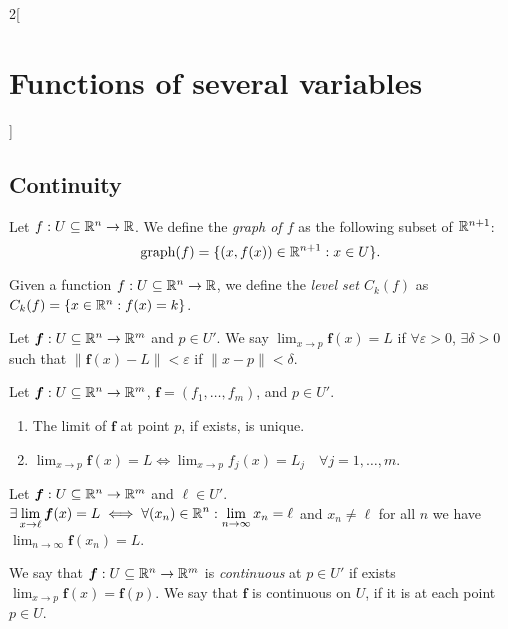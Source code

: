 \documentclass[../../../main.tex]{subfiles}
\begin{document}
\begin{multicols}{2}[\section{Functions of several variables}]
    \subsection{Continuity}
    \begin{definition}
        Let $f:U\subseteq\mathbb{R}^n\rightarrow\mathbb{R} $. We define the \textit{graph of $f$} as the following subset of $\mathbb{R}^{n+1}$: $$\text{graph}(f)=\{(x,f(x))\in\mathbb{R}^{n+1}:x\in U\}.$$
    \end{definition}
    \begin{definition}
        Given a function $f:U\subseteq\mathbb{R}^n\rightarrow\mathbb{R} $, we define the \textit{level set $C_k(f)$} as $C_k(f)=\{x\in\mathbb{R}^n:f(x)=k\}$.
    \end{definition}
    \begin{definition}
        Let $\boldsymbol{f}:U\subseteq\mathbb{R}^n\rightarrow\mathbb{R}^m$ and $p\in U'$. We say $\displaystyle\lim_{x\to p}\boldsymbol{f}(x)=L$ if $\forall\varepsilon>0$, $\exists\delta>0$ such that $\|\mathbf{\boldsymbol{f}}(x)-L\|<\varepsilon$ if $\|x-p\|<\delta$.
    \end{definition}
    \begin{prop}
        Let $\mathbf{\boldsymbol{f}}:U\subseteq\mathbb{R}^n\rightarrow\mathbb{R}^m$, $\mathbf{\boldsymbol{f}}=(f_1,\ldots,f_m)$, and $p\in U'$.
        \begin{enumerate}
            \item The limit of $\mathbf{\boldsymbol{f}}$ at point $p$, if exists, is unique.
            \item $\displaystyle\lim_{x\to p}\mathbf{\boldsymbol{f}}(x)=L\iff\lim_{x\to p}f_j(x)=L_j\quad\forall j=1,\ldots,m$.
        \end{enumerate}
    \end{prop}
    \begin{lemma}
        Let $\mathbf{\boldsymbol{f}}:U\subseteq\mathbb{R}^n\rightarrow\mathbb{R}^m$ and $\ell\in U'$. $\displaystyle\exists\lim_{x\to \ell}\mathbf{\boldsymbol{f}}(x)=L\iff\forall(x_n)\in\mathbb{R}^n:\lim_{n\to\infty}x_n=\ell$ and $x_n\ne \ell$ for all $n$ we have $\displaystyle\lim_{n\to \infty}\mathbf{\boldsymbol{f}}(x_n)=L$.
    \end{lemma}
    \begin{definition}
        We say that $\mathbf{\boldsymbol{f}}:U\subseteq\mathbb{R}^n\rightarrow\mathbb{R}^m$ is \textit{continuous} at $p\in U'$ if exists $\displaystyle\lim_{x\to p}\mathbf{\boldsymbol{f}}(x)=\mathbf{\boldsymbol{f}}(p)$. We say that $\mathbf{\boldsymbol{f}}$ is continuous on $U$, if it is at each point $p\in U$.

\end{definition}
\end{multicols}
\end{document}
